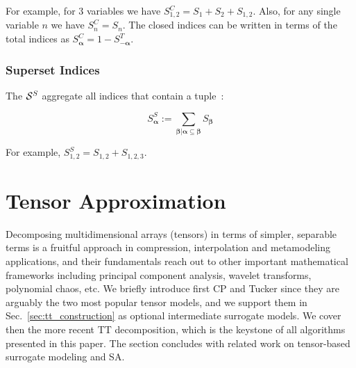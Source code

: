 \documentclass[review, twocolumn]{svjour3}          %
\begin{document}
For example, for 3 variables we have $S^C_{1,2} = S_1 + S_2 + S_{1,2}$. Also, for any single variable $n$ we have $S^C_n = S_n$. The closed indices can be written in terms of the total indices as $S^C_{\pmb{\alpha}} = 1 - S^T_{-\pmb{\alpha}}$.

\subsubsection{Superset Indices}

The $\mathcal{S}^S$ aggregate all indices that contain a tuple~\cite{Hooker:04}:

\begin{equation}
S^S_{\pmb{\alpha}} := \sum_{\pmb{\beta} | \pmb{\alpha} \subseteq \pmb{\beta}} S_{\pmb{\beta}}
\end{equation}

For example, $S^S_{1,2} = S_{1,2} + S_{1,2,3}$.






\section{Tensor Approximation}
\label{sec:tensor_decompositions}


Decomposing multidimensional arrays (tensors) in terms of simpler, separable terms is a fruitful approach in compression, interpolation and metamodeling applications, and their fundamentals reach out to other important mathematical frameworks including principal component analysis, wavelet transforms, polynomial chaos, etc. We briefly introduce first CP and Tucker since they are arguably the two most popular tensor models, and we support them in Sec.~\ref{sec:tt_construction} as optional intermediate surrogate models. We cover then the more recent TT decomposition, which is the keystone of all algorithms presented in this paper. The section concludes with related work on tensor-based surrogate modeling and SA.
\end{document}
